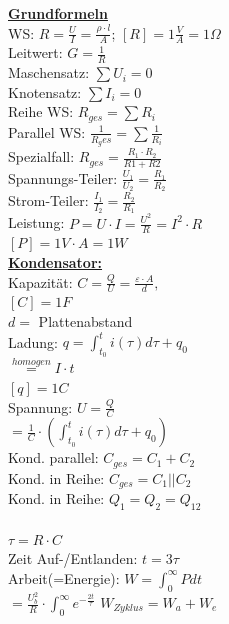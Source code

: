 \documentclass[11pt]{article}
\begin{document}

\begin{minipage}{0.45\textwidth}
\underline{\textbf{Grundformeln}}\\
WS: $R = \frac{U}{I} = \frac{\rho \cdot l}{A}$; $[R] = 1\frac{V}{A} =1 \Omega$ \\
Leitwert: $G = \frac{1}{R}$\\
Maschensatz: $\sum U_i = 0$\\
Knotensatz: $\sum I_i = 0$\\
Reihe WS: $R_{ges} = \sum R_i$\\
Parallel WS: $\frac{1}{R_ges} = \sum \frac{1}{R_i}$\\
\phantom{ss} Spezialfall: $R_{ges} = \frac{R_1 \cdot R_2}{R1+R2} $\\
Spannungs-Teiler: $\frac{U_1}{U_2} = \frac{R_1}{R_2}$\\
Strom-Teiler: $\frac{I_1}{I_2} = \frac{R_2}{R_1}$\\
Leistung: $P =U \cdot I = \frac{U^2}{R} = I^2 \cdot R $ \\
\phantom{ssssssssss} $[P] = 1V \cdot A =1 W$\\
\underline{\textbf{Kondensator:}}\\
Kapazität: $C = \frac{Q}{U} = \frac{\varepsilon \cdot A }{d},$\\
\phantom{ssssssssssii} $[C]=1F$\\
\phantom{sssssssssssii} $d =$ Plattenabstand\\
Ladung: $q = \int_{t_0}^t i(\tau) d\tau + q_0$\\
\phantom{sssssssis} $\stackrel{homogen}{=} I \cdot t$\\
\phantom{ssssssssssii} $[q]=1C$\\
Spannung: $U = \frac{Q}{C}$\\
\phantom{ssi} $= \frac{1}{C} \cdot (\int_{t_0}^t i(\tau) d\tau + q_0)$\\
Kond. parallel: $C_{ges} = C_1 + C_2$\\
Kond. in Reihe: $C_{ges} = C_1 || C_2$\\
Kond. in Reihe: $Q_1 = Q_2 = Q_{12}$\\
\\
$\tau = R \cdot C$\\
Zeit Auf-/Entlanden: $t = 3\tau$\\
Arbeit(=Energie): $W = \int_0^\infty P dt$\\
\phantom{sssssssss} $= \frac{U_b^2}{R} \cdot \int_0^\infty e^{-\frac{2t}{\tau}}$
$W_{Zyklus} = W_a + W_e$\\


\end{minipage}
\end{document}
